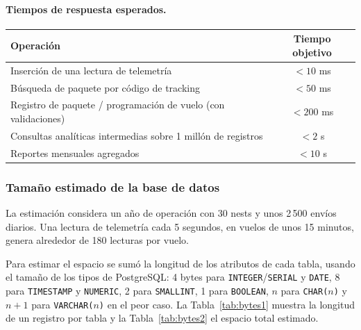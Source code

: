 \documentclass[11pt,a4paper]{article}
\begin{document}
\paragraph{Tiempos de respuesta esperados.}
\begin{center}
\begin{tabular}{lc}
\toprule
Operación & Tiempo objetivo \\
\midrule
Inserción de una lectura de telemetría & $< 10$ ms \\
Búsqueda de paquete por código de tracking & $< 50$ ms \\
Registro de paquete / programación de vuelo (con validaciones) & $< 200$ ms \\
Consultas analíticas intermedias sobre 1 millón de registros & $< 2$ s \\
Reportes mensuales agregados & $< 10$ s \\
\bottomrule
\end{tabular}
\end{center}

\subsubsection{Tamaño estimado de la base de datos}
La estimación considera un año de operación con 30 nests y unos 2\,500 envíos diarios. Una lectura de telemetría cada 5 segundos, en vuelos de unos 15 minutos, genera alrededor de 180 lecturas por vuelo.

Para estimar el espacio se sumó la longitud de los atributos de cada tabla, usando el tamaño de los tipos de PostgreSQL: 4 bytes para \texttt{INTEGER}/\texttt{SERIAL} y \texttt{DATE}, 8 para \texttt{TIMESTAMP} y \texttt{NUMERIC}, 2 para \texttt{SMALLINT}, 1 para \texttt{BOOLEAN}, $n$ para \texttt{CHAR($n$)} y $n+1$ para \texttt{VARCHAR($n$)} en el peor caso. La Tabla~\ref{tab:bytes1} muestra la longitud de un registro por tabla y la Tabla~\ref{tab:bytes2} el espacio total estimado.
\end{document}
